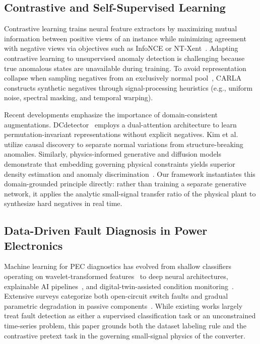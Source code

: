\documentclass[11pt,a4paper]{article}
\begin{document}
\subsection{Contrastive and Self-Supervised Learning}
Contrastive learning trains neural feature extractors by maximizing mutual information between positive views of an instance while minimizing agreement with negative views via objectives such as InfoNCE or NT-Xent~\cite{oord2018representation,chen2020simclr}. Adapting contrastive learning to unsupervised anomaly detection is challenging because true anomalous states are unavailable during training. To avoid representation collapse when sampling negatives from an exclusively normal pool~\cite{chen2023harnessing}, CARLA~\cite{darban2025carla} constructs synthetic negatives through signal-processing heuristics (e.g., uniform noise, spectral masking, and temporal warping). 

Recent developments emphasize the importance of domain-consistent augmentations. DCdetector~\cite{yang2023dcdetector} employs a dual-attention architecture to learn permutation-invariant representations without explicit negatives. Kim et al.~\cite{kim2025causalityaware} utilize causal discovery to separate normal variations from structure-breaking anomalies. Similarly, physics-informed generative and diffusion models demonstrate that embedding governing physical constraints yields superior density estimation and anomaly discrimination~\cite{raissi2019pinn,soni2025physicsinformed}. Our framework instantiates this domain-grounded principle directly: rather than training a separate generative network, it applies the analytic small-signal transfer ratio of the physical plant to synthesize hard negatives in real time.

\subsection{Data-Driven Fault Diagnosis in Power Electronics}
Machine learning for PEC diagnostics has evolved from shallow classifiers operating on wavelet-transformed features~\cite{kou2023faultdiagnosis} to deep neural architectures, explainable AI pipelines~\cite{beattie2022robust,li2025explainability}, and digital-twin-assisted condition monitoring~\cite{idrisov2025digitaltwin,gomez2024selfcommissioning}. Extensive surveys categorize both open-circuit switch faults and gradual parametric degradation in passive components~\cite{liu2023review,dang2020capacitors}. While existing works largely treat fault detection as either a supervised classification task or an unconstrained time-series problem, this paper grounds both the dataset labeling rule and the contrastive pretext task in the governing small-signal physics of the converter.
\end{document}
